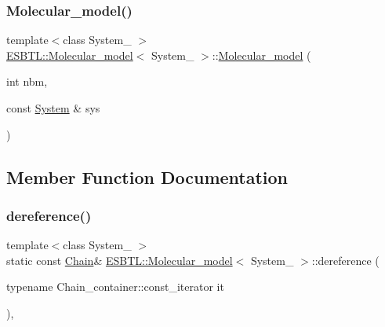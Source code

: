 \subsubsection{\texorpdfstring{Molecular\+\_\+model()}{Molecular\_model()}}
{\footnotesize\ttfamily template$<$class System\+\_\+ $>$ \\
\hyperlink{classESBTL_1_1Molecular__model}{E\+S\+B\+T\+L\+::\+Molecular\+\_\+model}$<$ System\+\_\+ $>$\+::\hyperlink{classESBTL_1_1Molecular__model}{Molecular\+\_\+model} (\begin{DoxyParamCaption}\item[{int}]{nbm,  }\item[{const \hyperlink{classESBTL_1_1Molecular__model_a08cec17302607b3b5f43c94746032996}{System} \&}]{sys }\end{DoxyParamCaption})\hspace{0.3cm}{\ttfamily [inline]}}



\subsection{Member Function Documentation}
\mbox{\label{classESBTL_1_1Molecular__model_adf64056283aad0292e60c5aae7c27d6f}} 
\subsubsection{\texorpdfstring{dereference()}{dereference()}\hspace{0.1cm}{\footnotesize\ttfamily [1/2]}}
{\footnotesize\ttfamily template$<$class System\+\_\+ $>$ \\
static const \hyperlink{classESBTL_1_1Molecular__model_a1d055eb841e64e198a1987e120fc985d}{Chain}\& \hyperlink{classESBTL_1_1Molecular__model}{E\+S\+B\+T\+L\+::\+Molecular\+\_\+model}$<$ System\+\_\+ $>$\+::dereference (\begin{DoxyParamCaption}\item[{typename Chain\+\_\+container\+::const\+\_\+iterator}]{it }\end{DoxyParamCaption})\hspace{0.3cm}{\ttfamily [inline]}, {\ttfamily [static]}}

\mbox{\label{classESBTL_1_1Molecular__model_a36477a79b12abc38a6ca592d2b65859a}} 
